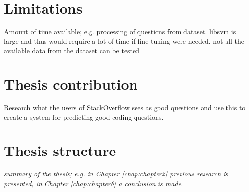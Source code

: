 \section{Limitations}
\label{sec:limitations}
Amount of time available; e.g. processing of questions from dataset. libsvm is large and thus would require a lot of time if fine tuning were needed. not all the available 
data from the dataset can be tested

\section{Thesis contribution}
\label{sec:thesis_contribution}
Research what the users of StackOverflow sees as good questions and use this to create a system for predicting good coding questions.

\section{Thesis structure}
\label{sec:thesis_structure}
\textit{summary of the thesis; e.g. in Chapter \ref{chap:chapter2} previous research is presented, in Chapter \ref{chap:chapter6} a conclusion is made.}
